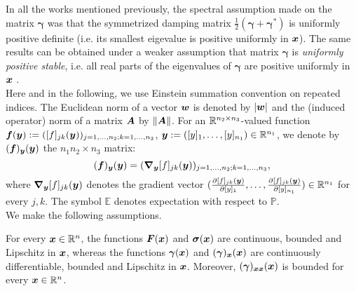 In all the works mentioned previously, the spectral assumption made on the matrix $\boldsymbol{\gamma}$ was that the symmetrized damping matrix  $\frac{1}{2}(\boldsymbol{\gamma} + \boldsymbol{\gamma}^{*})$ is uniformly positive definite (i.e. its smallest eigevalue is positive uniformly in $\boldsymbol{x}$). The same results can be obtained under a weaker assumption that matrix $\boldsymbol{\gamma}$ is {\it uniformly positive stable}, i.e. all real parts of the eigenvalues of $\boldsymbol{\gamma}$ are  positive uniformly in $\boldsymbol{x}$ \citep{horn1994topics}. \\



 Here and in the following, we use Einstein summation convention on repeated indices. The Euclidean norm of a vector $\boldsymbol{w}$ is denoted by $| \boldsymbol{w} |$ and the (induced operator) norm of a matrix $\boldsymbol{A}$ by $\| \boldsymbol{A} \|$. For an $\mathbb{R}^{n_2 \times n_3}$-valued function $\boldsymbol{f}(\boldsymbol{y}):=([f]_{jk}(\boldsymbol{y}))_{j=1,\dots,n_2; k=1,\dots, n_3}$, $\boldsymbol{y} := ([y]_1, \dots, [y]_{n_1}) \in \mathbb{R}^{n_1}$, we denote by $(\boldsymbol{f})_{\boldsymbol{y}}(\boldsymbol{y})$ the $n_1 n_2 \times n_3$ matrix:
\begin{equation}
(\boldsymbol{f})_{\boldsymbol{y}}(\boldsymbol{y}) = (\boldsymbol{\nabla}_{\boldsymbol{y}}[f]_{jk}(\boldsymbol{y}))_{j=1,\dots, n_2; k=1,\dots,n_3},  
\end{equation}
where $\boldsymbol{\nabla}_{\boldsymbol{y}}[f]_{jk}(\boldsymbol{y})$ denotes the gradient vector $(\frac{\partial [f]_{jk}(\boldsymbol{y})}{\partial [y]_1}, \dots, \frac{\partial [f]_{jk}(\boldsymbol{y})}{\partial [y]_{n_1}}) \in \mathbb{R}^{n_1}$ for every $j,k$.  
The symbol $\mathbb{E}$ denotes expectation with respect to $\mathbb{P}$. \\

We make the following assumptions. 

\begin{ass} \label{a1} For every $\boldsymbol{x} \in \mathbb{R}^n$, the functions $\boldsymbol{F}(\boldsymbol{x})$ and $\boldsymbol{\sigma}(\boldsymbol{x})$ are continuous, bounded and Lipschitz in $\boldsymbol{x}$, whereas the functions $\boldsymbol{\gamma}(\boldsymbol{x})$ and $(\boldsymbol{\gamma})_{\boldsymbol{x}}(\boldsymbol{x})$ are continuously differentiable, bounded and Lipschitz in $\boldsymbol{x}$. Moreover, $(\boldsymbol{\gamma})_{\boldsymbol{x} \boldsymbol{x}}(\boldsymbol{x})$ is bounded for every $\boldsymbol{x} \in \mathbb{R}^n$. 
\end{ass}

